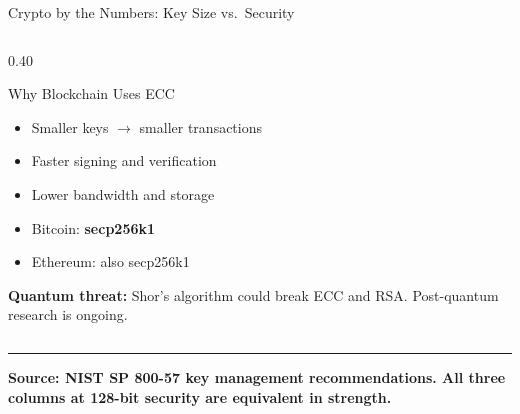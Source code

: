 \documentclass[8pt,aspectratio=169]{beamer}
\newcommand{\bottomnote}[1]{%
\vfill
\vspace{-2mm}
\textcolor{mllavender2}{\rule{\textwidth}{0.4pt}}
\vspace{1mm}
\footnotesize
\textbf{#1}
}
\begin{document}
\begin{frame}{Crypto by the Numbers: Key Size vs.\ Security}
\begin{columns}[T]
\begin{column}{0.40\textwidth}
\vspace{2mm}
\begin{block}{\small Why Blockchain Uses ECC}
\begin{itemize}\setlength\itemsep{2pt}
\item Smaller keys $\to$ smaller transactions
\item Faster signing and verification
\item Lower bandwidth and storage
\item Bitcoin: \textbf{secp256k1}
\item Ethereum: also secp256k1
\end{itemize}
\end{block}

\vspace{2mm}
{\scriptsize\textcolor{mlred}{\bfseries Quantum threat:} Shor's algorithm could break ECC and RSA. Post-quantum research is ongoing.}
\end{column}
\end{columns}
\bottomnote{Source: NIST SP 800-57 key management recommendations. All three columns at 128-bit security are equivalent in strength.}
\end{frame}
\end{document}
